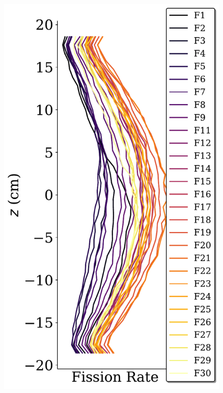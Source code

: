 \documentclass[fleqn]{beamer}
\begin{document}
\begin{frame}
\begin{columns}[c]
\begin{column}{.5\textwidth}
\begin{figure}
\includegraphics[height = 0.8\textheight]{axial_rr_density_F}
\end{figure}
\end{column}
\end{columns}

\end{frame}
\end{document}
